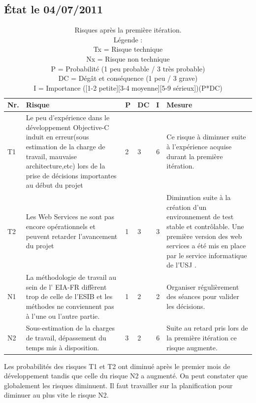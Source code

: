 	\subsection{État le 04/07/2011  }
	\begin{table}[H]
	\begin{tabular}{|l|p{6cm}|l|l|l|p{6cm}|}
		\hline  Nr. & Risque & P  & DC & I & Mesure \\ 
		\hline  {\color{green}T1} & Le peu d'expérience dans le développement \gls{Objective-C} induit en erreur(sous estimation de la charge de travail, mauvaise architecture,etc) lors de la prise de décisions importantes au début du projet & 2 & 3 & 6 & Ce risque à diminuer suite à l'expérience acquise durant la première itération.  \\ 
		\hline  {\color{green}T2} & Les Web Services ne sont pas encore opérationnels et peuvent retarder l'avancement du projet & 1 & 3 & 3 & Diminution suite à la création d'un environnement de test stable et contrôlable. Une première version des web services a été mis en place par le service informatique de l'\gls{USJ}  .  \\ 
		\hline  N1 & La méthodologie de travail au sein de l' \gls{EIA-FR} diffèrent trop de celle de l'\gls{ESIB}  et les méthodes ne conviennent pas à l'une ou l'autre partie.  & 1 & 2 & 2 & Organiser régulièrement des séances pour valider les décisions.  \\ 
		\hline  {\color{red}N2} & Sous-estimation de la charges de travail, dépassement du temps mis à disposition.  & 3 & 2 & 6 & Suite au retard pris lors de la première itération ce risque augmente.  \\ 
		
		\hline 
	\end{tabular} 
	\caption{ Risques après la première itération.\\ Légende :\\
Tx = Risque technique\\
Nx = Risque non technique\\
P = Probabilité  (1 peu probable / 3 très probable)\\ 
DC = Dégât et conséquence (1 peu / 3 grave)\\
I =  Importance ([1-2 petite][3-4 moyenne][5-9 sérieux])(P*DC)
}
	\end{table}
Les probabilités des risques T1 et T2  ont diminué après le premier mois de développement tandis que celle du risque N2 a augmenté. On peut constater que globalement les risques diminuent. Il faut travailler sur la planification pour diminuer au plus vite le risque N2.

